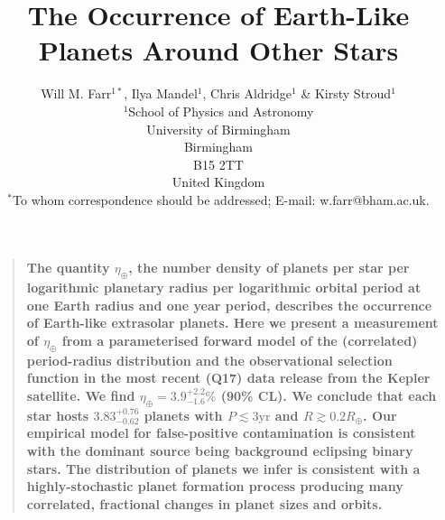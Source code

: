 \documentclass[12pt]{article}
\title{The Occurrence of Earth-Like Planets Around Other Stars}
\author{Will M. Farr$^{1\ast}$, Ilya Mandel$^{1}$, Chris Aldridge$^{1}$ \& Kirsty Stroud$^{1}$\\
  \normalsize{$^1$School of Physics and Astronomy}\\
  \normalsize{University of Birmingham}\\
  \normalsize{Birmingham}\\
  \normalsize{B15 2TT}\\
  \normalsize{United Kingdom}\\
  \normalsize{$^\ast$To whom correspondence should be addressed; E-mail: w.farr@bham.ac.uk.}}
\date{}
\newenvironment{sciabstract}{%
\begin{quote} \bf}
{\end{quote}}
\newcommand{\etaearth}{\eta_\oplus}
\newcommand{\REarth}{R_\oplus}
\newcommand{\earange}{3.9_{-1.6}^{+2.2}\%}
\newcommand{\rplrange}{3.83_{-0.62}^{+0.76}}
\begin{document}
\baselineskip24pt

\maketitle

\begin{sciabstract}
  The quantity $\etaearth$, the number density of planets per star per
  logarithmic planetary radius per logarithmic orbital period at one
  Earth radius and one year period, describes the occurrence of
  Earth-like extrasolar planets.  Here we present a
  measurement of $\etaearth$ from a parameterised forward model of the
  (correlated) period-radius distribution and the observational
  selection function in the most recent (Q17) data release from the
  Kepler satellite\cite{Borucki2010,Borucki2011,Batalha2013}.  We find
  $\etaearth = \earange$ (90\% CL).  We conclude that each star hosts
  $\rplrange$ planets with $P \lesssim 3 \mathrm{yr}$ and $R \gtrsim
  0.2 \REarth$.  Our empirical model for false-positive contamination
  is consistent with the dominant source being background eclipsing
  binary stars\cite{Fressin2013}.  The distribution of planets we
  infer is consistent with a highly-stochastic planet formation
  process producing many correlated, fractional changes in planet
  sizes and orbits.  
\end{sciabstract}
\end{document}
